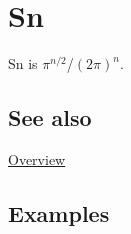 \documentclass[../FeynCalcManual.tex]{subfiles}
\begin{document}
\hypertarget{sn}{%
\section{Sn}\label{sn}}

Sn is \(\pi ^{n/2}\)/\((2\pi )^n\).

\subsection{See also}

\hyperlink{toc}{Overview}

\subsection{Examples}
\end{document}
